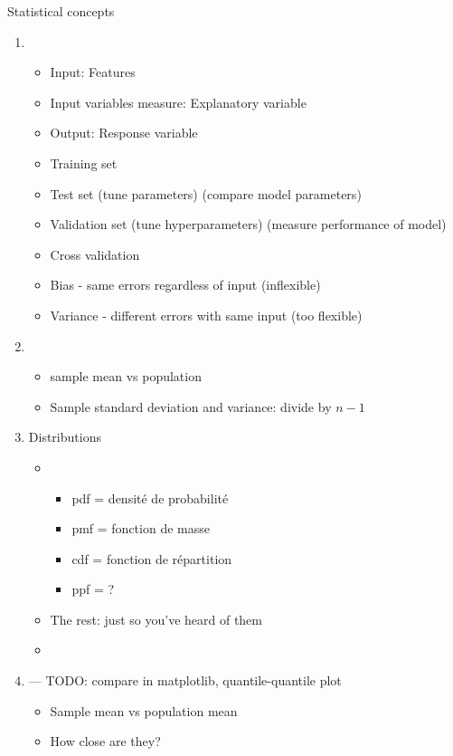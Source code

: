Statistical concepts
\begin{enumerate}
\item {}
  \begin{itemize}
  \item Input:  Features
  \item Input variables measure:  Explanatory variable
  \item Output: Response variable
  \item Training set
  \item Test set (tune parameters) (compare model parameters)
  \item Validation set (tune hyperparameters) (measure performance of model)
  \item Cross validation
  \item Bias - same errors regardless of input (inflexible)
  \item Variance - different errors with same input (too flexible)
  \end{itemize}
\item {}
  \begin{itemize}
  \item sample mean vs population 
  \item Sample standard deviation and variance: divide by $n-1$
  \end{itemize}
\item Distributions
  \begin{itemize}
  \item {}
    \begin{itemize}
    \item pdf = densité de probabilité
    \item pmf = fonction de masse
    \item cdf = fonction de répartition
    \item ppf = ?
    \end{itemize}
  \item The rest: just so you've heard of them
  \item {}
  \end{itemize}
\item {} --- TODO: compare in matplotlib, quantile-quantile plot
  \begin{itemize}
  \item Sample mean vs population mean
  \item How close are they?

\end{itemize}
\end{enumerate}
